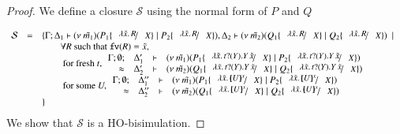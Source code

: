 \begin{proof}
	\noi We define a closure $\mathcal{S}$ using the normal form of $P$ and $Q$

	\[
		\begin{array}{rcll}
			\mathcal{S} &=& \set{\horel{\Gamma}{\Delta_1}{\newsp{\tilde{m_1}}{P_1 \subst{\abs{\tilde{x}}{R}}{X} \Par P_2 \subst{\abs{\tilde{x}}{R}}{X}}}{,}{\Delta_2}{\newsp{\tilde{m_2}}{Q_1 \subst{\abs{\tilde{x}}{R}}{X} \Par Q_2 \subst{\abs{\tilde{x}}{R}}{X}}} \setbar \\
			&& \qquad \forall R \textrm{ such that } \fv{R} = \tilde{x},\\
			&& \qquad \textrm{ for fresh } t,
			\mhorel{\Gamma}{\Delta_1'}
			{\newsp{\tilde{m_1}}{P_1 \subst{\abs{\tilde{x}}{\binp{t}{Y} \appl{Y}{\tilde{x}}}}{X} \Par P_2 \subst{\abs{\tilde{x}}{\binp{t}{Y} \appl{Y}{\tilde{x}}}}{X}}}
			{\wb}
			{\Delta_2'}{}{\newsp{\tilde{m_2}}{Q_1 \subst{\abs{\tilde{x}}{\binp{t}{Y} \appl{Y}{\tilde{x}}}}{X} \Par Q_2 \subst{\abs{\tilde{x}}{\binp{t}{Y} \appl{Y}{\tilde{x}}}}{X}}}\\
			&& \qquad \textrm{ for some } U, 
			\mhorel{\Gamma}{\Delta_1''}
			{\newsp{\tilde{m_1}}{P_1 \subst{\abs{\tilde{x}}{\mapchar{U}{x}}}{X} \Par P_2 \subst{\abs{\tilde{x}}{\mapchar{U}{x}}}{X}}}
			{\wb}
			{\Delta_2''}{}{\newsp{\tilde{m_2}}{Q_1 \subst{\abs{\tilde{x}}{\mapchar{U}{x}}}{X} \Par Q_2 \subst{\abs{\tilde{x}}{\mapchar{U}{x}}}{X}}} \\
			&&}
		\end{array}
	\]
%
%
	\noi We show that $\mathcal{S}$ is a HO-bisimulation.


\end{proof}
